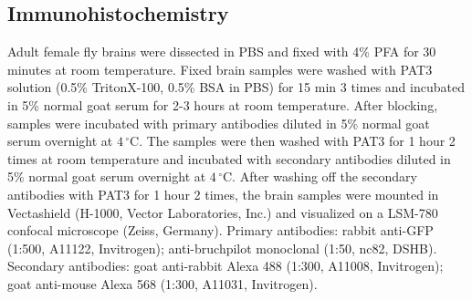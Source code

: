 \subsection*{Immunohistochemistry}

Adult female fly brains were dissected in PBS and fixed with 4\% PFA for 30 minutes at room temperature.
Fixed brain samples were washed with PAT3 solution (0.5\% TritonX-100, 0.5\% BSA in PBS) for 15 min 3 times and incubated in 5\% normal goat serum for 2-3 hours at room temperature.
After blocking, samples were incubated with primary antibodies diluted in 5\% normal goat serum overnight at $4\,^{\circ}\mathrm{C}$.
The samples were then washed with PAT3 for 1 hour 2 times at room temperature and incubated with secondary antibodies diluted in 5\% normal goat serum overnight at $4\,^{\circ}\mathrm{C}$.
After washing off the secondary antibodies with PAT3 for 1 hour 2 times, the brain samples were mounted in Vectashield (H-1000, Vector Laboratories, Inc.) and visualized on a LSM-780 confocal microscope (Zeiss, Germany).
Primary antibodies: rabbit anti-GFP (1:500, A11122, Invitrogen); anti-bruchpilot monoclonal (1:50, nc82, DSHB).
Secondary antibodies: goat anti-rabbit Alexa 488 (1:300, A11008, Invitrogen); goat anti-mouse Alexa 568 (1:300, A11031, Invitrogen).
  